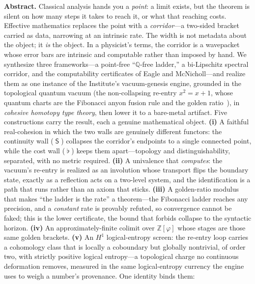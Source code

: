 \documentclass[11pt,letterpaper]{article}
\theoremstyle{plain}
\theoremstyle{definition}
\theoremstyle{remark}
\newcommand{\shapeM}{\mathop{\mathsf{S}}\nolimits}      %
\newcommand{\flatM}{\mathop{\flat}\nolimits}            %
\newcommand{\ZZ}{\mathbb{Z}}
\newcommand{\QQ}{\mathbb{Q}}
\newcommand{\Zphi}{\ZZ[\varphi]}
\begin{document}
\begin{titlingpage}
\vspace{0.8em}
\begin{minipage}{0.90\textwidth}
\footnotesize
\textbf{Abstract.}\quad
Classical analysis hands you a \emph{point}: a limit exists, but the theorem is
silent on how many steps it takes to reach it, or what that reaching costs.
Effective mathematics replaces the point with a \emph{corridor}---a two-sided
bracket carried as data, narrowing at an intrinsic rate. The width is not
metadata about the object; it \emph{is} the object. In a physicist's terms, the
corridor is a wavepacket whose error bars are intrinsic and computable rather
than imposed by hand. We synthesize three frameworks---a point-free
``$\QQ$-free ladder,'' a bi-Lipschitz spectral corridor, and the computability
certificates of Eagle and McNicholl---and realize them as one instance of the
Institute's vacuum-genesis engine, grounded in the topological quantum vacuum
(the non-collapsing re-entry $x^2{=}x{+}1$, whose quantum charts are the Fibonacci
anyon fusion rule and the golden ratio~\citep{iaom_quantum_atlas}), in
\emph{cohesive homotopy type theory}, then lower it to a bare-metal artifact. Five constructions carry the
result, each a genuine mathematical object. \textbf{(i)} A faithful real-cohesion
in which the two walls are genuinely different functors: the continuity wall
($\shapeM$) collapses the corridor's endpoints to a single connected point, while
the cost wall ($\flatM$) keeps them apart---topology and distinguishability,
separated, with no metric required. \textbf{(ii)} A univalence that
\emph{computes}: the vacuum's re-entry is realized as an involution whose
transport flips the boundary state, exactly as a reflection acts on a two-level
system, and the identification is a path that runs rather than an axiom that
sticks. \textbf{(iii)} A golden-ratio modulus that makes ``the ladder is the
rate'' a theorem---the Fibonacci ladder reaches any precision, and a
\emph{constant} rate is provably refuted, so convergence cannot be faked; this is
the lower certificate, the bound that forbids collapse to the syntactic
horizon. \textbf{(iv)} An approximately-finite colimit over $\Zphi$ whose stages
are those same golden brackets. \textbf{(v)} An $H^1$ logical-entropy screen: the
re-entry loop carries a cohomology class that is locally a coboundary but globally
nontrivial, of order two, with strictly positive logical entropy---a topological
charge no continuous deformation removes, measured in the same logical-entropy
currency the engine uses to weigh a number's provenance. One identity binds them:

\end{minipage}
\end{titlingpage}
\end{document}

